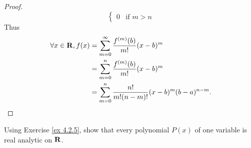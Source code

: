 \begin{proof}
\[\begin{cases}
            0                                   & \text{if } m > n
        \end{cases}
    \]
    Thus
    \begin{align*}
        \forall x \in \mathbf{R}, f(x) & = \sum_{m = 0}^\infty \frac{f^{(m)}(b)}{m!} (x - b)^m              \\
                               & = \sum_{m = 0}^n \frac{f^{(m)}(b)}{m!} (x - b)^m                   \\
                               & = \sum_{m = 0}^n \frac{n!}{m! (n - m)!} (x - b)^m (b - a)^{n - m}.
    \end{align*}
\end{proof}

\begin{exercise}\label{ex 4.2.6}
    Using Exercise \ref{ex 4.2.5}, show that every polynomial \(P(x)\) of one variable is real analytic on \(\mathbf{R}\).
\end{exercise}


